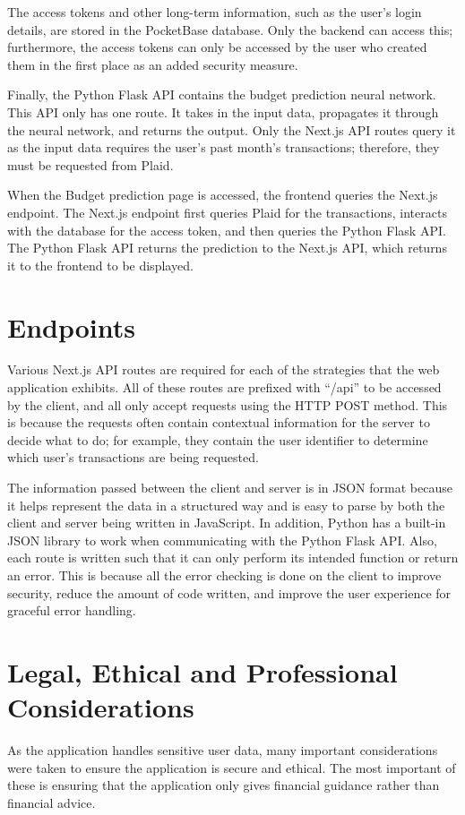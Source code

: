 The access tokens and other long-term information, such as the user's login details, are stored in the PocketBase database. Only the backend can access this; furthermore, the access tokens can only be accessed by the user who created them in the first place as an added security measure.

Finally, the Python Flask API contains the budget prediction neural network. This API only has one route. It takes in the input data, propagates it through the neural network, and returns the output. Only the Next.js API routes query it as the input data requires the user's past month's transactions; therefore, they must be requested from Plaid.

When the Budget prediction page is accessed, the frontend queries the Next.js endpoint. The Next.js endpoint first queries Plaid for the transactions, interacts with the database for the access token, and then queries the Python Flask API. The Python Flask API returns the prediction to the Next.js API, which returns it to the frontend to be displayed.

\section{Endpoints}
\label{sec:endpoints}
Various Next.js API routes are required for each of the strategies that the web application exhibits. All of these routes are prefixed with ``/api'' to be accessed by the client, and all only accept requests using the HTTP POST method. This is because the requests often contain contextual information for the server to decide what to do; for example, they contain the user identifier to determine which user's transactions are being requested.

The information passed between the client and server is in JSON format because it helps represent the data in a structured way and is easy to parse by both the client and server being written in JavaScript. In addition, Python has a built-in JSON library to work when communicating with the Python Flask API. Also, each route is written such that it can only perform its intended function or return an error. This is because all the error checking is done on the client to improve security, reduce the amount of code written, and improve the user experience for graceful error handling.

\section{Legal, Ethical and Professional Considerations}
As the application handles sensitive user data, many important considerations were taken to ensure the application is secure and ethical. The most important of these is ensuring that the application only gives financial guidance rather than financial advice.

